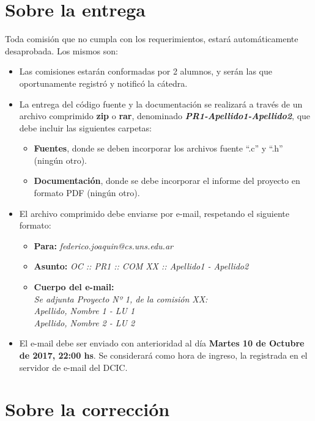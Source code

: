 \documentclass[12pt,a4paper]{article}
\begin{document}
\section*{Sobre la entrega}
Toda comisión que no cumpla con los requerimientos, estará automáticamente desaprobada. Los mismos son:
\begin{itemize}
		
	\item Las comisiones estarán conformadas por 2 alumnos, y serán las que oportunamente registró y notificó la cátedra.
		
	\item La entrega del código fuente y la documentación se realizará a través de un archivo comprimido \textbf{zip} o \textbf{rar}, denominado \textbf{\textit{PR1-Apellido1-Apellido2}}, que debe incluir las siguientes carpetas:
	\begin{itemize}
		\item \textbf{Fuentes}, donde se deben incorporar los archivos fuente “.c” y “.h” (ningún otro).
		\item \textbf{Documentación}, donde se debe incorporar el informe del proyecto en formato PDF (ningún otro).
	\end{itemize}		
	\item El archivo comprimido debe enviarse por e-mail, respetando el siguiente formato: 
	\begin{itemize}
		\item \textbf{Para:} \textit{federico.joaquin@cs.uns.edu.ar}
		\item \textbf{Asunto:} \textit{OC :: PR1 :: COM XX :: Apellido1 - Apellido2}
		\item \textbf{Cuerpo del e-mail:} \\
		\textit{Se adjunta Proyecto Nº 1, de la comisión XX: } \\
		\textit{Apellido, Nombre 1 - LU 1} \\
		\textit{Apellido, Nombre 2 - LU 2}
	\end{itemize}
	
	\item El e-mail debe ser enviado con anterioridad al día \textbf{Martes 10 de Octubre de 2017, 22:00 hs}. Se considerará como hora de ingreso, la registrada en el servidor de e-mail del DCIC.
		
\end{itemize}

\section*{Sobre la corrección}
\end{document}
